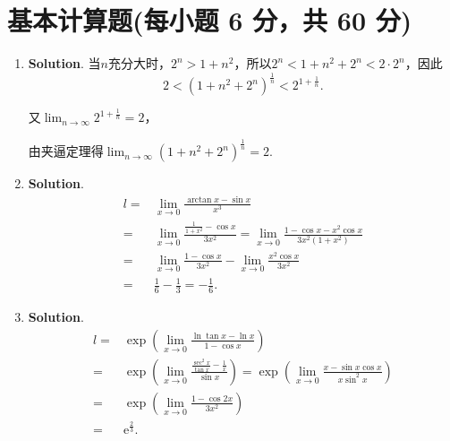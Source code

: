 \documentclass[../Main.tex]{subfiles}
\begin{document}
\section{基本计算题(每小题 6 分，共 60 分)}
\begin{enumerate}
    \item \textbf{Solution}. 当$n$充分大时，$2^{n}>1+n^{2}$，所以$2^{n}<1+n^{2}+2
                  ^{n}<2\cdot 2^{n}$，因此
          \[
              2<\left(1+n^{2}+2^{n}\right)^{\frac{1}{n}}<2^{1+\frac{1}{n}}.
          \]

          又$\lim_{n\to\infty}2^{1+\frac{1}{n}}=2$，

          由夹逼定理得$\lim_{n\to\infty}\left(1+n^{2}+2^{n}\right)^{\frac{1}{n}}=2$.

    \item \textbf{Solution}.
          \[
              \begin{aligned}
                  l = & \lim_{x\to 0}\frac{\arctan x-\sin x}{x^3}                                                          \\
                  =   & \lim_{x\to0}\frac{\frac{1}{1+x^2}-\cos x}{3x^2}=\lim_{x\to0}\frac{1-\cos x-x^2\cos x}{3x^2(1+x^2)} \\
                  =   & \lim_{x\to0}\frac{1-\cos x}{3x^2}- \lim_{x\to0}\frac{x^2\cos x}{3x^2}                              \\
                  =   & \frac{1}{6}-\frac{1}{3}=-\frac{1}{6}.
              \end{aligned}
          \]

    \item \textbf{Solution}.
          \[
              \begin{aligned}
                  l= & \exp\left(\lim_{x\to0}\frac{\ln\tan x-\ln x}{1-\cos x}\right)                                                                                 \\
                  =  & \exp\left(\lim_{x\to0}\frac{\frac{\sec^2 x}{\tan x}-\frac{1}{x}}{\sin x}\right)=\exp\left(\lim_{x\to0}\frac{x-\sin x\cos x}{x\sin^2 x}\right) \\
                  =  & \exp\left(\lim_{x\to0}\frac{1-\cos 2x}{3x^2}\right)                                                                                           \\
                  =  & \mathrm{e}^{\frac{2}{3}}.                                                                                                                     \\
              \end{aligned}
          \]


\end{enumerate}
\end{document}
